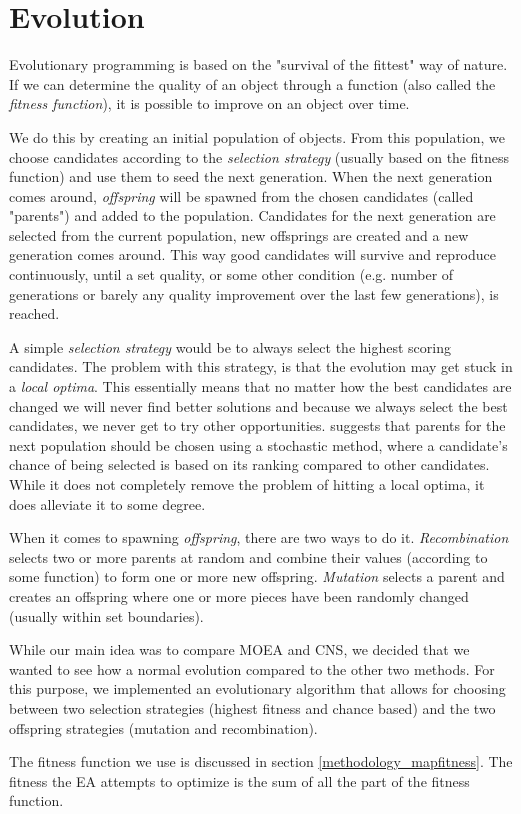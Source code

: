 \section{Evolution}
\label{methodology_evolution}

Evolutionary programming\cite{eiben2008introduction, eiben2002evolutionary} is based on the "survival of the fittest" way of nature. If we can determine the quality of an object through a function (also called the \textit{fitness function}), it is possible to improve on an object over time.

We do this by creating an initial population of objects. From this population, we choose candidates according to the \textit{selection strategy} (usually based on the fitness function) and use them to seed the next generation. When the next generation comes around, \textit{offspring} will be spawned from the chosen candidates (called "parents") and added to the population. Candidates for the next generation are selected from the current population, new offsprings are created and a new generation comes around. This way good candidates will survive and reproduce continuously, until a set quality, or some other condition (e.g. number of generations or barely any quality improvement over the last few generations), is reached.

A simple \textit{selection strategy} would be to always select the highest scoring candidates. The problem with this strategy, is that the evolution may get stuck in a \textit{local optima}. This essentially means that no matter how the best candidates are changed we will never find better solutions and because we always select the best candidates, we never get to try other opportunities. \citeauthor{rocha1999preventing}\cite{rocha1999preventing} suggests that parents for the next population should be chosen using a stochastic method, where a candidate's chance of being selected is based on its ranking compared to other candidates. While it does not completely remove the problem of hitting a local optima, it does alleviate it to some degree.

When it comes to spawning \textit{offspring}, there are two ways to do it\cite[Chapter 2]{shaker2015procedural}. \textit{Recombination} selects two or more parents at random and combine their values (according to some function) to form one or more new offspring. \textit{Mutation} selects a parent and creates an offspring where one or more pieces have been randomly changed (usually within set boundaries). 

While our main idea was to compare MOEA and CNS, we decided that we wanted to see how a normal evolution compared to the other two methods. For this purpose, we implemented an evolutionary algorithm that allows for choosing between two selection strategies (highest fitness and chance based) and the two offspring strategies (mutation and recombination). 

The fitness function we use is discussed in section \ref{methodology_mapfitness}. The fitness the EA attempts to optimize is the sum of all the part of the fitness function.
